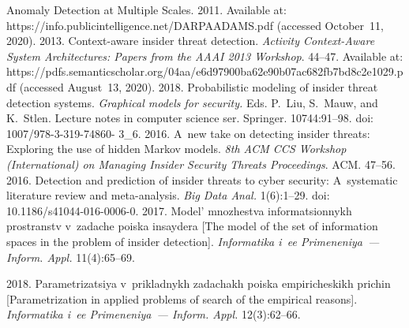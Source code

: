   \begin{multicols}{2}

\renewcommand{\bibname}{\protect\rmfamily References}

{\small\frenchspacing
 {%
 \begin{thebibliography}{99}

Anomaly Detection at Multiple Scales. 2011. Available at: 
{\sf https://info.publicintelligence.net/DARPAADAMS.pdf} (accessed October~11, 2020).
 2013. Context-aware insider threat detection. 
\textit{Activity 
Context-Aware System Architectures: Papers from the AAAI 2013 Workshop}. 44--47. Available at: {\sf 
https://pdfs.\linebreak  semanticscholar.org/04aa/e6d97900ba62e90b07ac682fb\linebreak 7bd8c2e1029.pdf} (accessed 
August~13, 2020).
 2018. Probabilistic modeling of insider threat detection systems. 
 \textit{Graphical models for security.} Eds. P.~Liu, S.~Mauw, and 
K.~\mbox{St{\!\ptb{\o}}len}. Lecture notes in computer science ser. Springer. 10744:91--98. doi: 1007/978-3-319-74860-
3\_6.
 2016. A~new take on detecting insider threats: 
Exploring the use of hidden Markov models. \textit{8th ACM CCS Workshop (International) on Managing 
Insider Security Threats Proceedings}. ACM. 47--56.
 2016. Detection and prediction of insider threats to cyber security: 
A~systematic literature review and  
meta-analysis. \textit{Big Data Anal.} 1(6):1--29. doi: 10.1186/s41044-016-0006-0.
 2017. Model' mnozhestva 
informatsionnykh prostranstv v~zadache poiska insaydera [The model of the set of information spaces in the 
problem of insider detection]. \textit{Informatika i~ee Primeneniya~--- Inform. Appl.} 11(4):65--69.

 2018. 
Parametrizatsiya v~prikladnykh zadachakh poiska empiricheskikh prichin [Parametrization in applied 
problems of search of the empirical reasons]. \textit{Informatika i~ee Primeneniya~--- Inform. Appl.} 
12(3):62--66.


\end{thebibliography}}}
\end{multicols}
